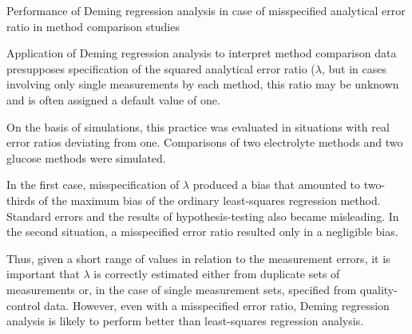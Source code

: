 Performance of Deming regression analysis in case of misspecified analytical error ratio in method comparison studies

Application of Deming regression analysis to interpret method comparison data presupposes specification of the 
squared analytical error ratio ($\lambda$, but in cases involving only single measurements by each method, this 
ratio may be unknown and is often assigned a default value of one. 

On the basis of simulations, this practice was evaluated in situations with real error ratios deviating from one. 
Comparisons of two electrolyte methods and two glucose methods were simulated. 

In the first case, misspecification of $\lambda$ produced a bias that amounted to two-thirds of the maximum bias of the 
ordinary least-squares regression method. Standard errors and the results of hypothesis-testing also became misleading. 
In the second situation, a misspecified error ratio resulted only in a negligible bias. 

Thus, given a short range of values in relation to the measurement errors, it is important that $\lambda$ is correctly 
estimated either from duplicate sets of measurements or, in the case of single measurement sets, specified from 
quality-control data. However, even with a misspecified error ratio, Deming regression analysis is likely to perform 
better than least-squares regression analysis.

